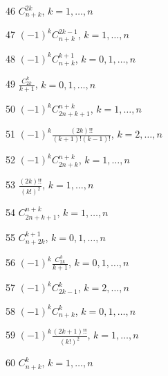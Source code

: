\documentclass[11pt, russian]{article}
\begin{document}
46 
$C_{n+k}^{2k}$, $k=1,\ldots,n$\par\vspace{5mm}

47 
$(-1)^{k}C_{n+k}^{2k-1}$, $k=1,\ldots,n$\par\vspace{5mm}

48 
$(-1)^{k}C_{n+k}^{k+1}$, $k=0,1,\ldots,n$\par\vspace{5mm}

49 
$\frac{C_{2k}^k}{k+1}$, $k=0,1,\ldots,n$\par\vspace{5mm}

50 
$(-1)^{k}C_{2n+k+1}^{n+k}$, $k=1,\ldots,n$\par\vspace{5mm}

51 
$(-1)^{k}\frac{(2k)!!}{(k+1)!(k-1)!}$, $k=2,\ldots,n$\par\vspace{5mm}

52 
$(-1)^{k}C_{2n+k}^{n+k}$, $k=1,\ldots,n$\par\vspace{5mm}

53 
$\frac{(2k)!!}{(k!)^2}$, $k=1,\ldots,n$\par\vspace{5mm}

54 
$C_{2n+k+1}^{n+k}$, $k=1,\ldots,n$\par\vspace{5mm}

55 
$C_{n+2k}^{k+1}$, $k=0,1,\ldots,n$\par\vspace{5mm}

56 
$(-1)^{k}\frac{C_{2k}^k}{k+1}$, $k=0,1,\ldots,n$\par\vspace{5mm}

57 
$(-1)^{k}C_{2k-1}^{k}$, $k=2,\ldots,n$\par\vspace{5mm}

58 
$(-1)^{k}C_{n+k}^{k}$, $k=0,1,\ldots,n$\par\vspace{5mm}

59 
$(-1)^{k}\frac{(2k+1)!!}{(k!)^2}$, $k=1,\ldots,n$\par\vspace{5mm}

60 
$C_{n+k}^{k}$, $k=1,\ldots,n$\par\vspace{5mm}
\end{document}
